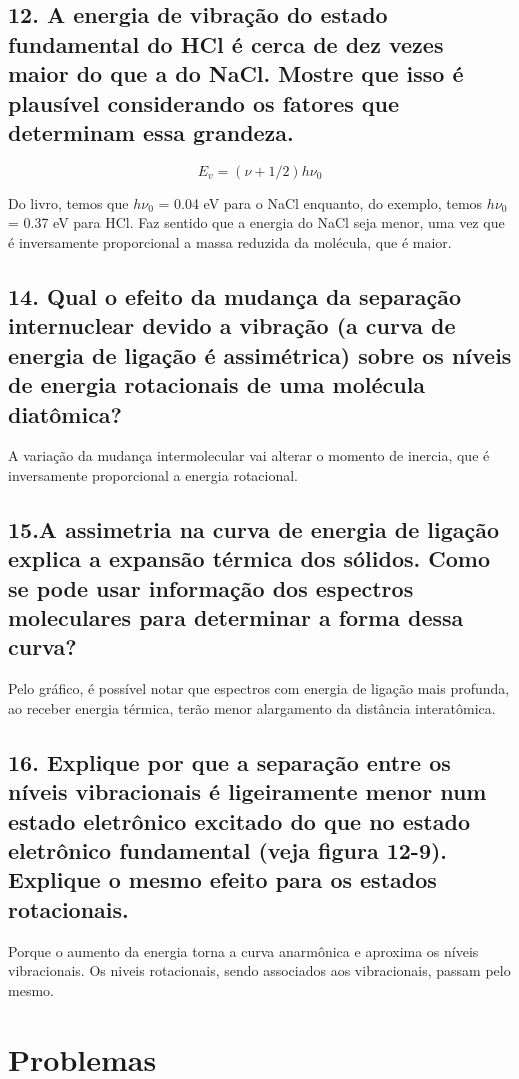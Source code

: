 \documentclass{article}
\begin{document}
\subsection{12. A energia de vibração do estado fundamental do HCl é cerca de dez vezes maior do que a do NaCl. Mostre que isso é plausível considerando os fatores que determinam essa grandeza.}
\[E_v = (\nu +1/2)h \nu_0\]

Do livro, temos que $h \nu_0$ = 0.04 eV para o NaCl enquanto, do exemplo, temos $h \nu_0$ = 0.37 eV para HCl. Faz sentido que a energia do NaCl seja menor, uma vez que é inversamente proporcional a massa reduzida da molécula, que é maior.

\subsection{14. Qual o efeito da mudança da separação internuclear devido a vibração (a curva de energia de ligação é assimétrica) sobre os níveis de energia rotacionais de uma molécula diatômica?}

A variação da mudança intermolecular vai alterar o momento de inercia, que é inversamente proporcional a energia rotacional.

\subsection{15.A assimetria na curva de energia de ligação explica a expansão térmica dos sólidos. Como se pode usar informação dos espectros moleculares para determinar a forma dessa curva?}

Pelo gráfico, é possível notar que espectros com energia de ligação mais profunda, ao receber energia térmica, terão menor alargamento da distância interatômica.

\subsection{16. Explique por que a separação entre os níveis vibracionais é ligeiramente menor num estado eletrônico excitado do que no estado eletrônico fundamental (veja figura 12-9). Explique o mesmo efeito para os estados rotacionais.}
Porque o aumento da energia torna a curva anarmônica e aproxima os níveis vibracionais. Os niveis rotacionais, sendo associados aos vibracionais, passam pelo mesmo.

\pagebreak

\section{Problemas}
\end{document}
